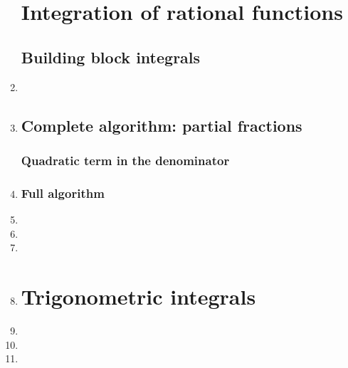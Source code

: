 \documentclass{article}
\begin{document}
\begin{enumerate}
\section{Integration of rational functions}
\subsection{Building block integrals}


\item 

\item 

\subsection{Complete algorithm: partial fractions}
\subsubsection{Quadratic term in the denominator}
\item 

\subsubsection{Full algorithm}
\item 

\item 

\item 


\item 

\section{Trigonometric integrals}
\item 

\item 

\item 



\end{enumerate}
\end{document}
